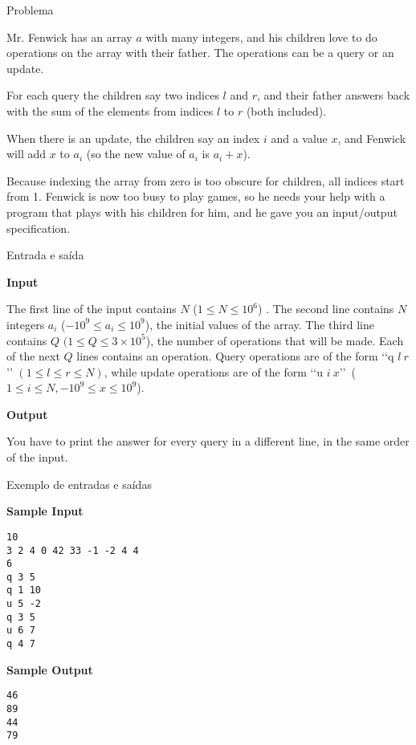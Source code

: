 
\begin{frame}[fragile]{Problema}

Mr. Fenwick has an array $a$ with many integers, and his children love to do operations on the
array with their father. The operations can be a query or an update.

For each query the children say two indices $l$ and $r$, and their father answers back with the 
sum of the elements from indices $l$ to $r$ (both included).

When there is an update, the children say an index $i$ and a value $x$, and Fenwick will add $x$ to
$a_i$ (so the new value of $a_i$  is $a_i + x$).

Because indexing the array from zero is too obscure for children, all indices start from 1.
Fenwick is now too busy to play games, so he needs your help with a program that plays with his
children for him, and he gave you an input/output specification.

\end{frame}

\begin{frame}[fragile]{Entrada e saída}

\textbf{Input}

The first line of the input contains $N$ ($1\leq N\leq 10^6$) . The second line contains $N$ 
integers $a_i$ ($-10^9\leq a_i\leq 10^9$), the initial values of the array. The third line 
contains $Q$ $(1\leq Q\leq 3\times 10^5$), the number of operations that will be made. Each of the 
next $Q$ lines contains an operation.  Query operations are of the form \lq\lq q $l\ r$\rq\rq 
$(1\leq l\leq r\leq N)$, while update operations are of the form \lq\lq u $i\ x$\rq\rq\ 
($1\leq i\leq N, -10^9\leq x\leq 10^9$).

\textbf{Output}

You have to print the answer for every query in a different
line, in the same order of the input.

\end{frame}

\begin{frame}[fragile]{Exemplo de entradas e saídas}

\begin{minipage}[t]{0.5\textwidth}
\textbf{Sample Input}
\begin{verbatim}
10
3 2 4 0 42 33 -1 -2 4 4
6
q 3 5
q 1 10
u 5 -2
q 3 5
u 6 7
q 4 7
\end{verbatim}
\end{minipage}
\begin{minipage}[t]{0.45\textwidth}
\textbf{Sample Output}
\begin{verbatim}
46
89
44
79
\end{verbatim}
\end{minipage}
\end{frame}


